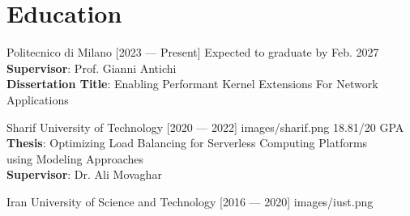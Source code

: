 \section{Education}
{Politecnico di Milano [2023 --- Present]}
{Expected to graduate by Feb. 2027}
{}
{\multilineCell
	{
    \hspace{5mm} \textbf{Supervisor}: Prof. Gianni Antichi \\
    \hspace{5mm} \textbf{Dissertation Title}: Enabling Performant Kernel Extensions For Network Applications
  }
}
\vspace{2mm}

{Sharif University of Technology [2020 --- 2022]}
{}
{images/sharif.png}
{\multilineCell
	{\hspace{5mm} 18.81/20 GPA \\
        \hspace{5mm} \textbf{Thesis}:
        Optimizing Load Balancing for Serverless Computing Platforms \\
        \hspace{10mm} using Modeling Approaches \\
        \hspace{5mm} \textbf{Supervisor}: Dr. Ali Movaghar}
}

{Iran University of Science and Technology [2016 --- 2020]}
{}
{images/iust.png}
{
}
\vspace{-9mm}


